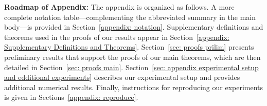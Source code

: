 \documentclass[accepted]{article}
\newif\ifshowappendix
\theoremstyle{plain} %
\theoremstyle{definition}
\theoremstyle{remark}
\begin{document}

\newpage
\ifshowappendix

\appendix 

\textbf{Roadmap of Appendix:}
The appendix is organized as follows. A more complete notation table—complementing the abbreviated summary in the main body—is provided in Section~\ref{appendix: notation}. Supplementary definitions and theorems used in the proofs of our results appear in Section~\ref{appendix: Supplementary Definitions and Theorems}. Section~\ref{sec: proofs prilim} presents preliminary results that support the proofs of our main theorems, which are then detailed in Section~\ref{sec: proofs main}. Section~\ref{sec: appendix experimental setup and edditional experiments} describes our experimental setup and provides additional numerical results. 
Finally, instructions for reproducing our experiments is given in Sections~\ref{appendix: reproduce}.
\end{document}
